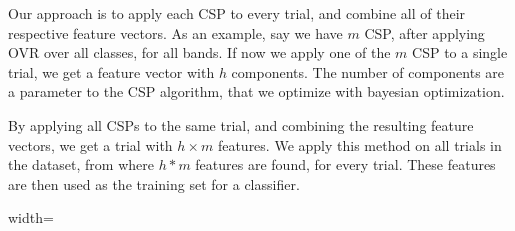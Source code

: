 Our approach is to apply each CSP to every trial, and combine all of their respective feature vectors. As an example, say we have $m$ CSP, after applying OVR over all classes, for all bands. If now we apply one of the $m$ CSP to a single trial, we get a feature vector with $h$ components. The number of components are a parameter to the CSP algorithm, that we optimize with bayesian optimization.

By applying all CSPs to the same trial, and combining the resulting feature vectors, we get a trial with $h \times m$ features. We apply this method on all trials in the dataset, from where $h * m$ features are found, for every trial. These features are then used as the training set for a classifier. 

\begin {figure*}%
\centering
\begin{adjustbox}{width=\textwidth}
\end{adjustbox}
\end{figure*}
